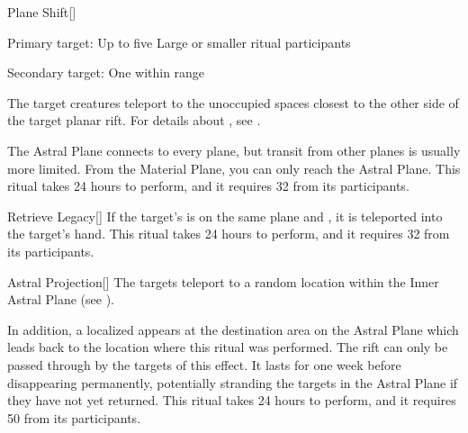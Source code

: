\lowercase{\hypertarget{spell:Plane Shift}{}}\label{spell:Plane Shift}
\begin{freeability}[Rank 4]{\hypertarget{spell:Plane Shift}{Plane Shift}}[]

Primary target: Up to five Large or smaller ritual participants
\par\noindent
Secondary target: One  within \rngmed range

The target creatures teleport to the unoccupied spaces closest to the other side of the target planar rift.
For details about , see .

The Astral Plane connects to every plane, but transit from other planes is usually more limited.
From the Material Plane, you can only reach the Astral Plane.
This ritual takes 24 hours to perform, and it requires 32  from its participants.
\end{freeability}
\vspace{0.25em}



\lowercase{\hypertarget{spell:Retrieve Legacy}{}}\label{spell:Retrieve Legacy}
\begin{freeability}[Rank 4]{\hypertarget{spell:Retrieve Legacy}{Retrieve Legacy}}[]
If the target's  is on the same plane and , it is teleported into the target's hand.
This ritual takes 24 hours to perform, and it requires 32  from its participants.
\end{freeability}
\vspace{0.25em}



\lowercase{\hypertarget{spell:Astral Projection}{}}\label{spell:Astral Projection}
\begin{freeability}[Rank 5]{\hypertarget{spell:Astral Projection}{Astral Projection}}[]
The targets teleport to a random location within the Inner Astral Plane (see ).

In addition, a localized  appears at the destination area on the Astral Plane which leads back to the location where this ritual was performed.
The rift can only be passed through by the targets of this effect.
It lasts for one week before disappearing permanently, potentially stranding the targets in the Astral Plane if they have not yet returned.
This ritual takes 24 hours to perform, and it requires 50  from its participants.
\end{freeability}
\vspace{0.25em}



